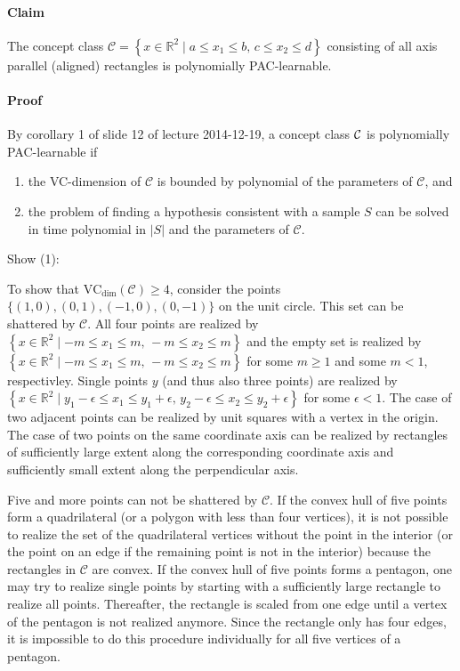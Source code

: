 \paragraph*{Claim}

The concept class $\mathcal{C}=\left\{ x\in\mathbb{R}^{2}\mid a\leq x_{1}\leq b,\, c\leq x_{2}\leq d\right\} $
consisting of all axis parallel (aligned) rectangles is polynomially
PAC-learnable.


\paragraph*{Proof}

By corollary 1 of slide 12 of lecture 2014-12-19, a concept class
$\text{\ensuremath{\mathcal{C}}}$ is polynomially PAC-learnable if 
\begin{enumerate}
\item the VC-dimension of $\mathcal{C}$ is bounded by polynomial of the
parameters of $\mathcal{C}$, and
\item the problem of finding a hypothesis consistent with a sample $S$
can be solved in time polynomial in $\vert S\vert$ and the parameters
of $\mathcal{C}$.
\end{enumerate}
Show (1):

To show that $\mathrm{VC_{dim}}(\mathcal{C})\geq4$, consider the points
$\{(1,0),(0,1),(-1,0),(0,-1)\}$ on the unit circle. This set can
be shattered by $\mathcal{C}$. All four points are realized by $\left\{ x\in\mathbb{R}^{2}\mid-m\leq x_{1}\leq m,\,-m\leq x_{2}\leq m\right\} $
and the empty set is realized by $\left\{ x\in\mathbb{R}^{2}\mid-m\leq x_{1}\leq m,\,-m\leq x_{2}\leq m\right\} $
for some $m\geq1$ and some $m<1$, respectivley. Single points $y$
(and thus also three points) are realized by $\left\{ x\in\mathbb{R}^{2}\mid y_{1}-\epsilon\leq x_{1}\leq y_{1}+\epsilon,\, y_{2}-\epsilon\leq x_{2}\leq y_{2}+\epsilon\right\} $
for some $\epsilon<1$. The case of two adjacent points can be realized
by unit squares with a vertex in the origin. The case of two points
on the same coordinate axis can be realized by rectangles of sufficiently
large extent along the corresponding coordinate axis and sufficiently
small extent along the perpendicular axis.

Five and more points can not be shattered by $\mathcal{C}$. If the
convex hull of five points form a quadrilateral (or a polygon with
less than four vertices), it is not possible to realize the set of
the quadrilateral vertices without the point in the interior (or the
point on an edge if the remaining point is not in the interior) because
the rectangles in $\mathcal{C}$ are convex. If the convex hull of
five points forms a pentagon, one may try to realize single points
by starting with a sufficiently large rectangle to realize all points.
Thereafter, the rectangle is scaled from one edge until a vertex of
the pentagon is not realized anymore. Since the rectangle only has
four edges, it is impossible to do this procedure individually for
all five vertices of a pentagon.

